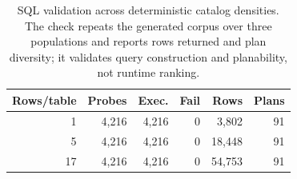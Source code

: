 \begin{table}[t]
\centering
\caption{SQL validation across deterministic catalog densities.  The check repeats the generated corpus over three populations and reports rows returned and plan diversity; it validates query construction and planability, not runtime ranking.}
\label{tab:sql-multicatalog}
\footnotesize
\setlength{\tabcolsep}{3pt}
\begin{tabular}{@{}rrrrrr@{}}
\toprule
Rows/table & Probes & Exec. & Fail & Rows & Plans \\
\midrule
1 & 4,216 & 4,216 & 0 & 3,802 & 91 \\
5 & 4,216 & 4,216 & 0 & 18,448 & 91 \\
17 & 4,216 & 4,216 & 0 & 54,753 & 91 \\
\bottomrule
\end{tabular}
\end{table}
